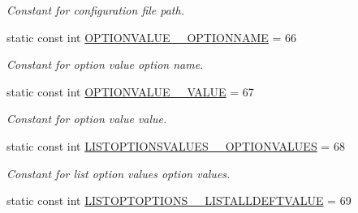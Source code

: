 \begin{DoxyCompactItemize}
\begin{DoxyCompactList}\small\item\em Constant for configuration file path. \item\end{DoxyCompactList}\item 
\hypertarget{classUMS__Data_1_1UMS__DataPackage_a324aac930bc7bada5a57e26f3a570b18}{
static const int \hyperlink{classUMS__Data_1_1UMS__DataPackage_a324aac930bc7bada5a57e26f3a570b18}{OPTIONVALUE\_\-\_\-OPTIONNAME} = 66}
\label{classUMS__Data_1_1UMS__DataPackage_a324aac930bc7bada5a57e26f3a570b18}

\begin{DoxyCompactList}\small\item\em Constant for option value option name. \item\end{DoxyCompactList}\item 
\hypertarget{classUMS__Data_1_1UMS__DataPackage_a3a6ade9c935dfe14bce64cc33cf4af4b}{
static const int \hyperlink{classUMS__Data_1_1UMS__DataPackage_a3a6ade9c935dfe14bce64cc33cf4af4b}{OPTIONVALUE\_\-\_\-VALUE} = 67}
\label{classUMS__Data_1_1UMS__DataPackage_a3a6ade9c935dfe14bce64cc33cf4af4b}

\begin{DoxyCompactList}\small\item\em Constant for option value value. \item\end{DoxyCompactList}\item 
\hypertarget{classUMS__Data_1_1UMS__DataPackage_a1ab37ab84bcd814beafc48c437d723c1}{
static const int \hyperlink{classUMS__Data_1_1UMS__DataPackage_a1ab37ab84bcd814beafc48c437d723c1}{LISTOPTIONSVALUES\_\-\_\-OPTIONVALUES} = 68}
\label{classUMS__Data_1_1UMS__DataPackage_a1ab37ab84bcd814beafc48c437d723c1}

\begin{DoxyCompactList}\small\item\em Constant for list option values option values. \item\end{DoxyCompactList}\item 
\hypertarget{classUMS__Data_1_1UMS__DataPackage_abafe59bd36045623f3f930dc491a49a9}{
static const int \hyperlink{classUMS__Data_1_1UMS__DataPackage_abafe59bd36045623f3f930dc491a49a9}{LISTOPTOPTIONS\_\-\_\-LISTALLDEFTVALUE} = 69}
\label{classUMS__Data_1_1UMS__DataPackage_abafe59bd36045623f3f930dc491a49a9}


\end{DoxyCompactItemize}
